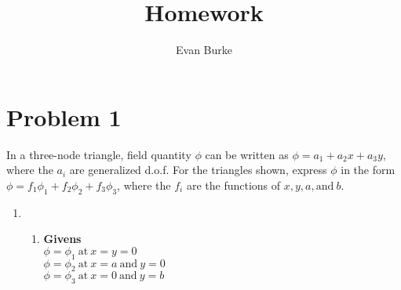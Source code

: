\documentclass[12pt,letterpaper]{article}
\author{Evan Burke}
\title{Homework \homeworknumber}
\begin{document}
	
	
	\tableofcontents
	
	\newpage
	
	\section*{Problem 1}
	In a three-node triangle, field quantity $\phi$ can be written as $\phi = a_1 + a_2x + a_3y$, where the $a_i$ are generalized d.o.f. For the triangles shown, express $\phi$ in the form $\phi = f_1\phi_1 + f_2\phi_2 + f_3\phi_3$, where the $f_i$ are the functions of $x, y, a, \mathrm{and} \ b$.
	\begin{enumerate}[label=(\alph*)]
		\item 

		\begin{enumerate}[label=\arabic*.]
			
			\item{\textbf{Givens}} \\
			$\phi = \phi_1 \ \mathrm{at} \ x = y = 0$\\ 
			$\phi = \phi_2 \ \mathrm{at} \ x = a \ \mathrm{and} \ y = 0$\\
			$\phi = \phi_3 \ \mathrm{at} \ x = 0 \ \mathrm{and} \ y = b$\\
				

\end{enumerate}
\end{enumerate}
\end{document}
